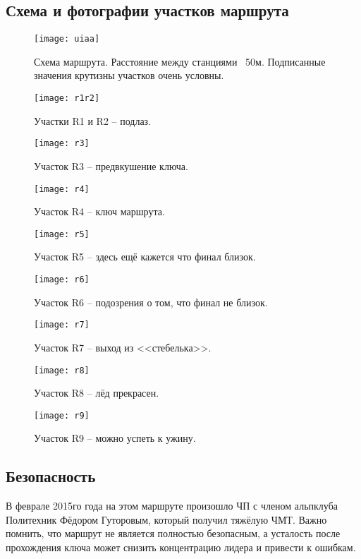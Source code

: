 \documentclass[fleqn, 10pt]{extarticle}
\begin{document}
\subsection{Схема и фотографии участков маршрута}
	\begin{figure}[ht]
		\centering
		\texttt{[image: uiaa]}
		\caption{Схема маршрута. Расстояние между станциями ~50м. Подписанные значения крутизны участков очень условны.}\label{uiaa}
	\end{figure}
	\begin{figure}[ht]
		\centering
		\texttt{[image: r1r2]}
		\caption{Участки R1 и R2 -- подлаз.}\label{r1r2}
	\end{figure}
	\begin{figure}[ht]
		\centering
		\texttt{[image: r3]}
		\caption{Участок R3 -- предвкушение ключа.}\label{r3}
	\end{figure}
	\begin{figure}[ht]
		\centering
		\texttt{[image: r4]}
		\caption{Участок R4 -- ключ маршрута.}\label{r4}
	\end{figure}
	\begin{figure}[ht]
		\centering
		\texttt{[image: r5]}
		\caption{Участок R5 -- здесь ещё кажется что финал близок.}\label{r5}
	\end{figure}
	\begin{figure}[ht]
		\centering
		\texttt{[image: r6]}
		\caption{Участок R6 -- подозрения о том, что финал не близок.}\label{r6}
	\end{figure}
	\begin{figure}[ht]
		\centering
		\texttt{[image: r7]}
		\caption{Участок R7 -- выход из <<стебелька>>.}\label{r1r2}
	\end{figure}
	\begin{figure}[ht]
		\centering
		\texttt{[image: r8]}
		\caption{Участок R8 -- лёд прекрасен.}\label{r8}
	\end{figure}
	\begin{figure}[ht]
		\centering
		\texttt{[image: r9]}
		\caption{Участок R9 -- можно успеть к ужину.}\label{r9}
	\end{figure}
	\FloatBarrier

\subsection{Безопасность}
	В феврале 2015го года на этом маршруте произошло ЧП с членом альпклуба Политехник Фёдором Гуторовым, который получил тяжёлую ЧМТ. Важно помнить,
	что маршрут не является полностью безопасным,
	а усталость после прохождения ключа может снизить концентрацию лидера и привести к ошибкам.
	
\end{document}
